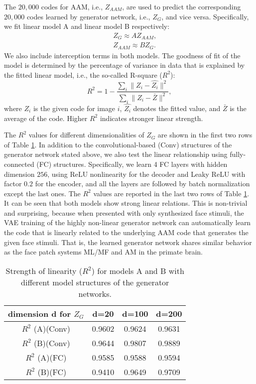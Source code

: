 \documentclass{article}
\begin{document}
The $20,000$ codes for AAM, i.e., $Z_{AAM}$, are used to predict the corresponding $20,000$ codes learned by generator network, i.e., $Z_{G}$, and vice versa. Specifically, we fit linear model A and linear model B respectively: 
\begin{eqnarray}
&& Z_{G} \approx A Z_{AAM},\\
&& Z_{AAM} \approx B Z_{G}. 
\end{eqnarray}
We also include interception terms in both models. The goodness of fit of the model is determined by the percentage of variance in data that is explained by the fitted linear model, i.e., the so-called R-square ($R^2$):
\begin{equation}
R^2 = 1 - \frac{\sum_i \|Z_i - \hat{Z_i}\|^2}{\sum_i \|Z_i - \bar{Z}\|^2},
\end{equation} 
where $Z_i$ is the given code for image $i$, $\hat{Z_i}$ denotes the fitted value, and $\bar{Z}$ is the average of the code. Higher $R^2$ indicates  stronger linear strength.

The $R^2$ values for different dimensionalities of $Z_{G}$ are shown in the first two rows of Table \ref{tab:R2}. In addition to the convolutional-based (Conv) structures of the generator network stated above, we also test the linear relationship using fully-connected (FC) structures. Specifically, we learn 4 FC layers with hidden dimension $256$, using ReLU nonlinearity for the decoder and Leaky ReLU with factor $0.2$ for the encoder, and all the layers are followed by batch normalization except the last ones. The $R^2$ values are reported in the last two rows of Table \ref{tab:R2}. It can be seen that both models show  strong linear relations. This is non-trivial and surprising, because when presented with only synthesized face stimuli, the VAE training of the highly non-linear generator network \cite{montufar2014number} can automatically learn the code that is linearly related to the underlying AAM code that generates the given face stimuli. That is, the learned generator network shares similar behavior as the face patch systems ML/MF and AM  in the primate brain. 

\begin{table}[h]
	\begin{center}
		\begin{tabular}{|c|c|c|c|}
			\hline dimension d for $Z_{G}$	&	d=20	& d=100	& d=200	\\
			\hline $R^2$ (A)(Conv)	&	0.9602	& 0.9624	& 	0.9631\\
			\hline $R^2$ (B)(Conv)    &   0.9644   &  0.9807      &   0.9889   \\ \hline
			\hline $R^2$ (A)(FC)	&	0.9585	& 0.9588	& 	0.9594\\
			\hline $R^2$ (B)(FC)   &   0.9410   &  0.9649      &   0.9709   \\
			\hline
		\end{tabular}		
		\caption{Strength of linearity ($R^2$) for models A and B with different model structures of the generator networks. } 
		\label{tab:R2}
	\end{center}
\end{table}
\end{document}
